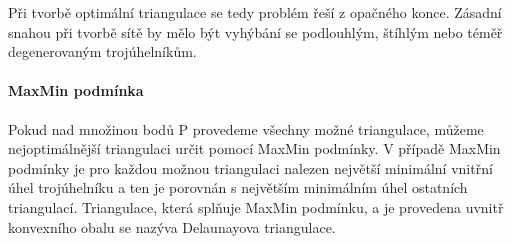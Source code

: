 \documentclass[12pt,a4paper]{article}
\begin{document}
Při tvorbě optimální triangulace se tedy problém řeší z opačného konce. Zásadní snahou při tvorbě sítě by mělo být vyhýbání se podlouhlým, štíhlým nebo téměř degenerovaným trojúhelníkům. 

\paragraph{MaxMin podmínka}

Pokud nad množinou bodů P provedeme všechny možné triangulace, můžeme nejoptimálnější triangulaci určit pomocí MaxMin podmínky. V případě MaxMin podmínky je pro každou možnou triangulaci nalezen největší minimální vnitřní úhel trojúhelníku a ten je porovnán s největším minimálním úhel ostatních triangulací. Triangulace, která splňuje MaxMin podmínku, a je provedena uvnitř konvexního obalu se nazýva Delaunayova triangulace.
\end{document}
